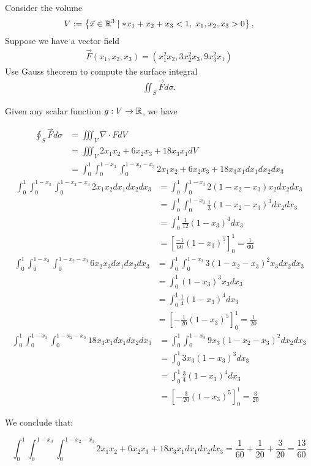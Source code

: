 \documentclass[11pt]{article}
\begin{document}
\begin{exercise} %
    Consider the volume 
    \begin{align}
     V := \left\{ \vec x \in \bbR^3 \suchthat* x_1 + x_2 + x_3 < 1, \; x_1, x_2, x_3 > 0 \right\},
    \end{align}
    Suppose we have a vector field 
    \begin{align}
        \vec F(x_1,x_2,x_3) = \left( x_1^2 x_2, 3 x_2^{2} x_3, 9 x_3^{2} x_1 \right)
    \end{align}
    Use Gauss theorem to compute the surface integral 
    \begin{align}
        \iint_{S} \vec F d\sigma.
    \end{align}
\end{exercise}
\begin{solution}     
    Given any scalar function $g : V \to \mathbb{R}$, we have 

    \begin{align*}
        \oint_{S} \vec F d\sigma & = \iiint_V \nabla \cdot F dV\\
		&= \iiint_V 2x_1x_2 + 6x_2x_3 + 18x_3x_1 dV\\
		&= \int_{0}^{1}\int_{0}^{1 - x_3}\int_{0}^{1 - x_2 - x_3} 2x_1x_2 + 6x_2x_3 + 18x_3x_1 dx_1 dx_2 dx_3
    \end{align*}
    \begin{align*}
        \int_{0}^{1}\int_{0}^{1 - x_3}\int_{0}^{1 - x_2 - x_3} 2x_1x_2 dx_1 dx_2 dx_3 &= \int_{0}^{1}\int_{0}^{1 - x_3} 2(1-x_2-x_3)x_2 dx_2 dx_3\\
	&= \int_{0}^{1}\int_{0}^{1 - x_3} \frac{1}{3}(1-x_2-x_3)^3 dx_2 dx_3\\
	&= \int_{0}^{1} \frac{1}{12}(1-x_3)^4 dx_3\\
	&= \left[ \frac{-1}{60}(1-x_3)^5\right]_0^1 = \frac{1}{60}
    \end{align*}
    \begin{align*}
        \int_{0}^{1}\int_{0}^{1 - x_3}\int_{0}^{1 - x_2 - x_3} 6x_2x_3  dx_1 dx_2 dx_3 &= \int_{0}^{1}\int_{0}^{1 - x_3} 3(1 - x_2 - x_3)^2 x_3   dx_2 dx_3 \\
	&= \int_{0}^{1} (1 - x_3)^3 x_3   dx_3 \\
	&= \int_{0}^{1} \frac{1}{4}(1 - x_3)^4  dx_3 \\
	&= \left[-\frac{1}{20}(1 - x_3)^5 \right]_0^1 = \frac{1}{20}
    \end{align*}
	\begin{align*}
         \int_{0}^{1}\int_{0}^{1 - x_3}\int_{0}^{1 - x_2 - x_3} 18x_3x_1 dx_1 dx_2 dx_3&= \int_{0}^{1}\int_{0}^{1 - x_3} 9x_3(1-x_2-x_3)^2   dx_2 dx_3 \\
	&=\int_{0}^{1} 3x_3(1-x_3)^3  dx_3 \\
	&= \int_{0}^{1} \frac{3}{4}(1-x_3)^4  dx_3 \\
	&= \left[-\frac{3}{20}(1-x_3)^5  \right]_0^1 =\frac{3}{20}
    \end{align*}

We conclude that:

$$
\int_{0}^{1}\int_{0}^{1 - x_3}\int_{0}^{1 - x_2 - x_3} 2x_1x_2 + 6x_2x_3 + 18x_3x_1 dx_1 dx_2 dx_3 = \frac{1}{60} + \frac{1}{20} + \frac{3}{20} = \frac{13}{60}
$$
\end{solution}
\end{document}
